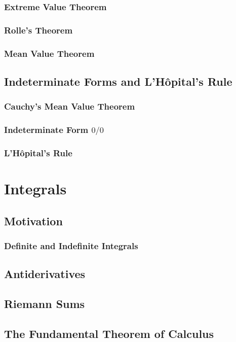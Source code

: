 \subsection{Extreme Value Theorem}
\subsection{Rolle's Theorem}
\subsection{Mean Value Theorem}

\section{Indeterminate Forms and L'Hôpital's Rule}
\subsection{Cauchy's Mean Value Theorem}
\subsection{Indeterminate Form $0/0$}
\subsection{L'Hôpital's Rule}

\chapter{Integrals}
\section{Motivation}
\subsection{Definite and Indefinite Integrals}

\section{Antiderivatives}

\section{Riemann Sums}


\section{The Fundamental Theorem of Calculus}

